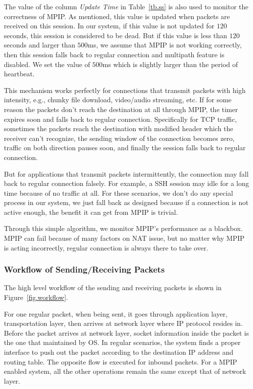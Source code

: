 The value of the column \emph{Update Time} in Table~\ref{tb.ss} is also used to monitor the correctness of MPIP. As mentioned, this value is updated when packets are received on this session. In our system, if this value is not updated for $120$ seconds, this session is considered to be dead. But if this value is less than $120$ seconds and larger than $500$ms, we assume that MPIP is not working correctly, then this session falls back to regular connection and multipath feature is disabled. We set the value of $500$ms which is slightly larger than the period of heartbeat.

This mechanism works perfectly for connections that transmit packets with high intensity, e.g., chunky file download, video/audio streaming, etc. If for some reason the packets don't reach the destination at all through MPIP, the timer expires soon and falls back to regular connection. Specifically for TCP traffic, sometimes the packets reach the destination with modified header which the receiver can't recognize, the sending window of the connection becomes zero, traffic on both direction pauses soon, and finally the session falls back to regular connection.

But for applications that transmit packets intermittently, the connection may fall back to regular connection falsely. For example, a SSH session may idle for a long time because of no traffic at all. For these scenarios, we don't do any special process in our system, we just fall back as designed because if a connection is not active enough, the benefit it can get from MPIP is trivial.

Through this simple algorithm, we monitor MPIP's performance as a blackbox. MPIP can fail because of many factors on NAT issue, but no matter why MPIP is acting incorrectly, regular connection is always there to take over.


\subsubsection{Workflow of Sending/Receiving Packets}

The high level workflow of the sending and receiving packets is shown in Figure~\ref{fig.workflow}.

For one regular packet, when being sent, it goes through application layer, transportation layer, then arrives at network layer where IP protocol resides in. Before the packet arrives at network layer, socket information inside the packet is the one that maintained by OS. In regular scenarios, the system finds a proper interface to push out the packet according to the destination IP address and routing table. The opposite flow is executed for inbound packets. For a MPIP enabled system, all the other operations remain the same except that of network layer.

